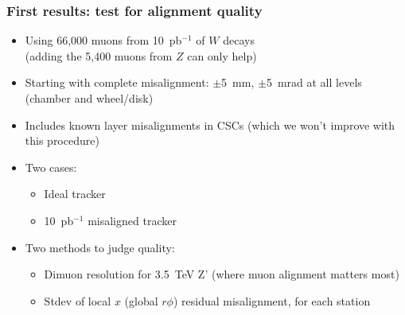\documentclass[compress]{beamer}
\begin{document}
\begin{frame}
\frametitle{First results: test for alignment quality}

\begin{itemize}\setlength{\itemsep}{0.1 cm}
\item Using 66,000 muons from 10~pb$^{-1}$ of $W$ decays \\ (adding the 5,400 muons from $Z$ can only help)
\item Starting with complete misalignment: $\pm$5~mm, $\pm$5~mrad at all levels (chamber and wheel/disk)
\item Includes known layer misalignments in CSCs (which we won't improve with this procedure)
\item Two cases:
\begin{itemize}
\item Ideal tracker
\item 10~pb$^{-1}$ misaligned tracker
\end{itemize}
\item Two methods to judge quality:
\begin{itemize}
\item Dimuon resolution for 3.5~TeV Z' (where muon alignment matters most)
\item Stdev of local $x$ (global $r\phi$) residual misalignment, for each station
\end{itemize}
\end{itemize}
\end{frame}
\end{document}
